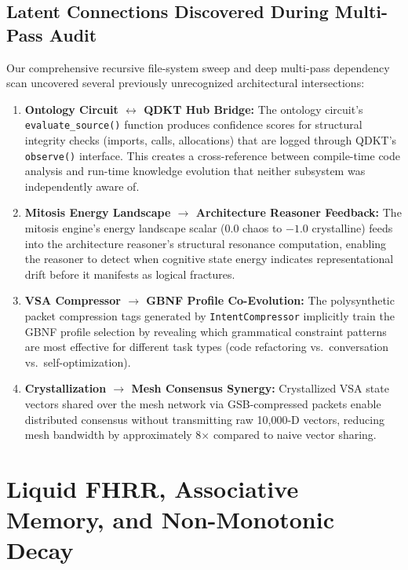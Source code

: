 \documentclass[11pt]{article}
\begin{document}
\subsection{Latent Connections Discovered During Multi-Pass Audit}

Our comprehensive recursive file-system sweep and deep multi-pass dependency scan uncovered several previously unrecognized architectural intersections:

\begin{enumerate}[label=\textbf{LC\arabic*}, leftmargin=*]
    \item \textbf{Ontology Circuit $\leftrightarrow$ QDKT Hub Bridge:} The ontology circuit's \texttt{evaluate\_source()} function produces confidence scores for structural integrity checks (imports, calls, allocations) that are logged through QDKT's \texttt{observe()} interface. This creates a cross-reference between compile-time code analysis and run-time knowledge evolution that neither subsystem was independently aware of.
    \item \textbf{Mitosis Energy Landscape $\rightarrow$ Architecture Reasoner Feedback:} The mitosis engine's energy landscape scalar (0.0 chaos to $-1.0$ crystalline) feeds into the architecture reasoner's structural resonance computation, enabling the reasoner to detect when cognitive state energy indicates representational drift before it manifests as logical fractures.
    \item \textbf{VSA Compressor $\rightarrow$ GBNF Profile Co-Evolution:} The polysynthetic packet compression tags generated by \texttt{IntentCompressor} implicitly train the GBNF profile selection by revealing which grammatical constraint patterns are most effective for different task types (code refactoring vs.\ conversation vs.\ self-optimization).
    \item \textbf{Crystallization $\rightarrow$ Mesh Consensus Synergy:} Crystallized VSA state vectors shared over the mesh network via GSB-compressed packets enable distributed consensus without transmitting raw 10,000-D vectors, reducing mesh bandwidth by approximately 8$\times$ compared to naive vector sharing.
\end{enumerate}

\section{Liquid FHRR, Associative Memory, and Non-Monotonic Decay}
\end{document}
